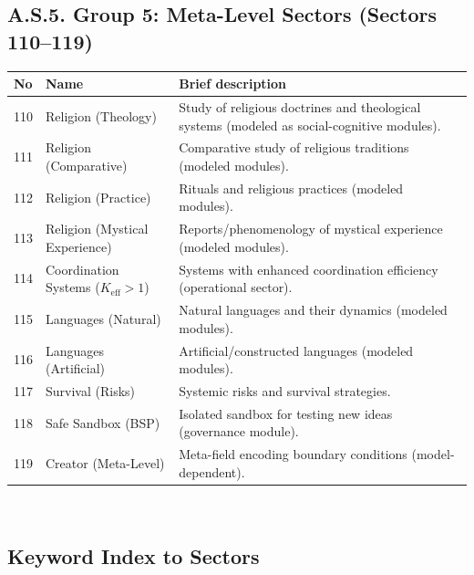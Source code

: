 \documentclass[13pt,a4paper]{article}
\newcommand{\Keff}{K_{\mathrm{eff}}}
\begin{document}
	\subsection*{A.S.5. Group 5: Meta-Level Sectors (Sectors 110--119)}
	
	\begin{longtable}{|p{0.9cm}|p{6.0cm}|p{8.6cm}|}
		\hline
		\textbf{No} & \textbf{Name} & \textbf{Brief description} \\
		\hline
		\endhead
		110 & Religion (Theology) & Study of religious doctrines and theological systems (modeled as social-cognitive modules). \\
		\hline
		111 & Religion (Comparative) & Comparative study of religious traditions (modeled modules). \\
		\hline
		112 & Religion (Practice) & Rituals and religious practices (modeled modules). \\
		\hline
		113 & Religion (Mystical Experience) & Reports/phenomenology of mystical experience (modeled modules). \\
		\hline
		114 & Coordination Systems ($\Keff>1$) & Systems with enhanced coordination efficiency (operational sector). \\
		\hline
		115 & Languages (Natural) & Natural languages and their dynamics (modeled modules). \\
		\hline
		116 & Languages (Artificial) & Artificial/constructed languages (modeled modules). \\
		\hline
		117 & Survival (Risks) & Systemic risks and survival strategies. \\
		\hline
		118 & Safe Sandbox (BSP) & Isolated sandbox for testing new ideas (governance module). \\
		\hline
		119 & Creator (Meta-Level) & Meta-field encoding boundary conditions (model-dependent). \\
		\hline
	\end{longtable}
	\
	\subsection*{Keyword Index to Sectors}
	
\end{document}
